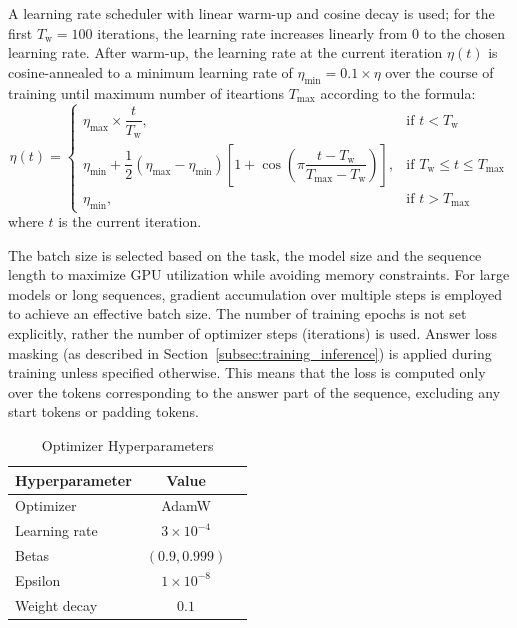 A learning rate scheduler with linear warm-up and cosine decay is used; for the first $T_{\text{w}} = 100$ iterations, the learning rate increases linearly from $0$ to the chosen learning rate. After warm-up, the learning rate at the current iteration $\eta(t)$ is cosine-annealed to a minimum learning rate of $\eta_{\text{min}} = 0.1 \times \eta$ over the course of training until maximum number of iteartions $T_{\text{max}}$ according to the formula:
\[
    \eta(t) =
    \begin{cases}
        \eta_{\text{max}} \times \dfrac{t}{T_{\text{w}}},                                                                                                                          & \text{if } t < T_{\text{w}}                        \\
        \eta_{\text{min}} + \dfrac{1}{2} (\eta_{\text{max}} - \eta_{\text{min}}) \left[1 + \cos\left( \pi \dfrac{t - T_{\text{w}}}{T_{\text{max}} - T_{\text{w}}} \right) \right], & \text{if } T_{\text{w}} \leq t \leq T_{\text{max}} \\
        \eta_{\text{min}},                                                                                                                                                         & \text{if } t > T_{\text{max}}
    \end{cases}
\]
where $t$ is the current iteration.

The batch size is selected based on the task, the model size and the sequence length to maximize GPU utilization while avoiding memory constraints. For large models or long sequences, gradient accumulation over multiple steps is employed to achieve an effective batch size. The number of training epochs is not set explicitly, rather the number of optimizer steps (iterations) is used. Answer loss masking (as described in Section~\ref{subsec:training_inference}) is applied during training unless specified otherwise. This means that the loss is computed only over the tokens corresponding to the answer part of the sequence, excluding any start tokens or padding tokens.

\begin{table}[h]
    \centering
    \caption{Optimizer Hyperparameters}
    \label{tab:optimizer_hyperparameters}
    \begin{tabular}{lcc}
        \toprule
        Hyperparameter & Value              \\
        \midrule
        Optimizer      & AdamW              \\
        Learning rate  & $3 \times 10^{-4}$ \\
        Betas          & $(0.9, 0.999)$     \\
        Epsilon        & $1 \times 10^{-8}$ \\
        Weight decay   & $0.1$              \\
        \bottomrule
    \end{tabular}
\end{table}


